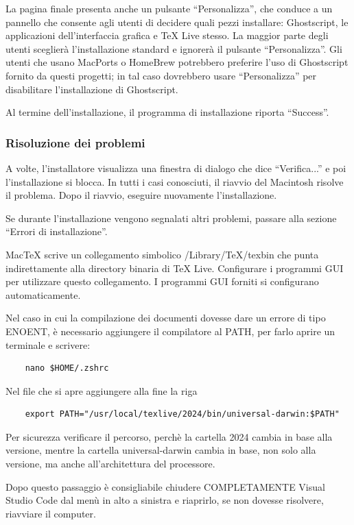 \documentclass[envcountsame,envcountchap]{svmono}
\begin{document}
La pagina finale presenta anche un pulsante “Personalizza”, che conduce a un pannello che consente agli utenti di decidere quali pezzi installare: Ghostscript, le applicazioni dell'interfaccia grafica e TeX Live stesso. La maggior parte degli utenti sceglierà l'installazione standard e ignorerà il pulsante “Personalizza”. Gli utenti che usano MacPorts o HomeBrew potrebbero preferire l'uso di Ghostscript fornito da questi progetti; in tal caso dovrebbero usare “Personalizza” per disabilitare l'installazione di Ghostscript.

Al termine dell'installazione, il programma di installazione riporta “Success”.


\subsubsection{Risoluzione dei problemi}
A volte, l'installatore visualizza una finestra di dialogo che dice “Verifica...” e poi l'installazione si blocca. In tutti i casi conosciuti, il riavvio del Macintosh risolve il problema. Dopo il riavvio, eseguire nuovamente l'installazione.

Se durante l'installazione vengono segnalati altri problemi, passare alla sezione “Errori di installazione”.

MacTeX scrive un collegamento simbolico /Library/TeX/texbin che punta indirettamente alla directory binaria di TeX Live. Configurare i programmi GUI per utilizzare questo collegamento. I programmi GUI forniti si configurano automaticamente.

Nel caso in cui la compilazione dei documenti dovesse dare un errore di tipo ENOENT, è necessario aggiungere il compilatore al PATH,
per farlo aprire un terminale e scrivere:
\begin{verbatim}
    nano $HOME/.zshrc
\end{verbatim}
Nel file che si apre aggiungere alla fine la riga
\begin{verbatim}
    export PATH="/usr/local/texlive/2024/bin/universal-darwin:$PATH"
\end{verbatim}
Per sicurezza verificare il percorso, perchè la cartella 2024 cambia in base alla versione, mentre la cartella universal-darwin cambia in base, non solo alla versione, ma anche all'architettura del processore.

Dopo questo passaggio è consigliabile chiudere COMPLETAMENTE Visual Studio Code dal menù in alto a sinistra e riaprirlo, se non dovesse risolvere, riavviare il computer.
\end{document}
